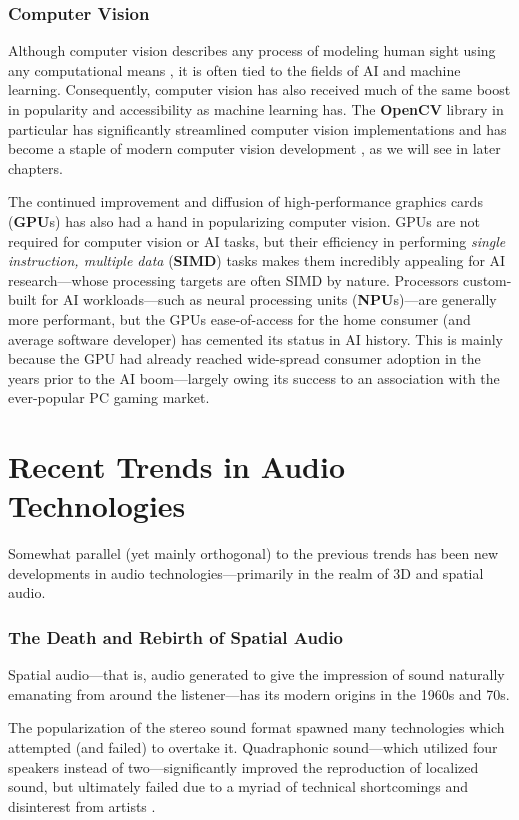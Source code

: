 \documentclass{report}
\newcommand{\tech}[1]{\textbf{#1}}
\begin{document}
\subsubsection{Computer Vision}
Although computer vision describes any process of modeling human sight using any computational means \cite{Huang1996ComputerVE}, it is often tied to the fields of AI and machine learning. Consequently, computer vision has also received much of the same boost in popularity and accessibility as machine learning has. The \tech{OpenCV} library in particular has significantly streamlined computer vision implementations and has become a staple of modern computer vision development \cite{culjak2012brief}, as we will see in later chapters.

The continued improvement and diffusion of high-performance graphics cards (\tech{GPU}s) has also had a hand in popularizing computer vision. GPUs are not required for computer vision or AI tasks, but their efficiency in performing \emph{single instruction, multiple data} (\textbf{SIMD}) tasks makes them incredibly appealing for AI research---whose processing targets are often SIMD by nature. Processors custom-built for AI workloads---such as neural processing units (\tech{NPU}s)---are generally more performant, but the GPUs ease-of-access for the home consumer (and average software developer) has cemented its status in AI history. This is mainly because the GPU had already reached wide-spread consumer adoption in the years prior to the AI boom---largely owing its success to an association with the ever-popular PC gaming market.


\section{Recent Trends in Audio Technologies}
Somewhat parallel (yet mainly orthogonal) to the previous trends has been new developments in audio technologies---primarily in the realm of 3D and spatial audio.

\subsubsection{The Death and Rebirth of Spatial Audio}
Spatial audio---that is, audio generated to give the impression of sound naturally emanating from around the listener---has its modern origins in the 1960s and 70s. 

The popularization of the stereo sound format spawned many technologies which attempted (and failed) to overtake it. Quadraphonic sound---which utilized four speakers instead of two---significantly improved the reproduction of localized sound, but ultimately failed due to a myriad of technical shortcomings and disinterest from artists \cite{Eguchi_1973}. 
\end{document}
